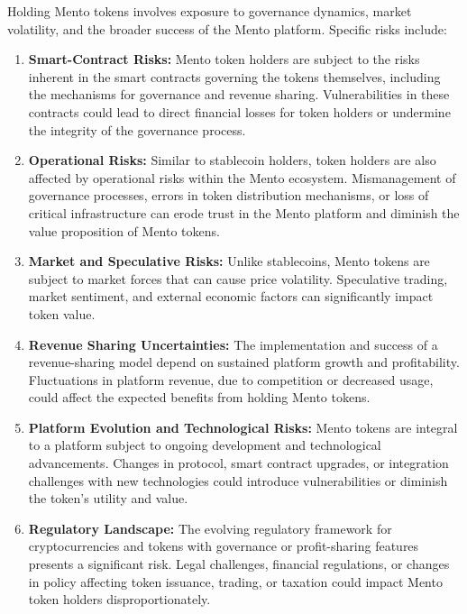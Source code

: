 \documentclass[a4paper]{article}
\theoremstyle{definition}
\begin{document}
\begin{appendices}
Holding Mento tokens involves exposure to governance dynamics, market volatility, and the broader success of the Mento platform. Specific risks include:

\begin{enumerate}
    \item \textbf{Smart-Contract Risks:} Mento token holders are subject to the risks inherent in the smart contracts governing the tokens themselves, including the mechanisms for governance and revenue sharing. Vulnerabilities in these contracts could lead to direct financial losses for token holders or undermine the integrity of the governance process.
    
    \item \textbf{Operational Risks:} Similar to stablecoin holders, token holders are also affected by operational risks within the Mento ecosystem. Mismanagement of governance processes, errors in token distribution mechanisms, or loss of critical infrastructure can erode trust in the Mento platform and diminish the value proposition of Mento tokens.
    
    \item \textbf{Market and Speculative Risks:} Unlike stablecoins, Mento tokens are subject to market forces that can cause price volatility. Speculative trading, market sentiment, and external economic factors can significantly impact token value.
    
    \item \textbf{Revenue Sharing Uncertainties:} The implementation and success of a revenue-sharing model depend on sustained platform growth and profitability. Fluctuations in platform revenue, due to competition or decreased usage, could affect the expected benefits from holding Mento tokens.
    
    \item \textbf{Platform Evolution and Technological Risks:} Mento tokens are integral to a platform subject to ongoing development and technological advancements. Changes in protocol, smart contract upgrades, or integration challenges with new technologies could introduce vulnerabilities or diminish the token's utility and value.
    
    \item \textbf{Regulatory Landscape:} The evolving regulatory framework for cryptocurrencies and tokens with governance or profit-sharing features presents a significant risk. Legal challenges, financial regulations, or changes in policy affecting token issuance, trading, or taxation could impact Mento token holders disproportionately.
\end{enumerate}


\end{appendices}
\end{document}
